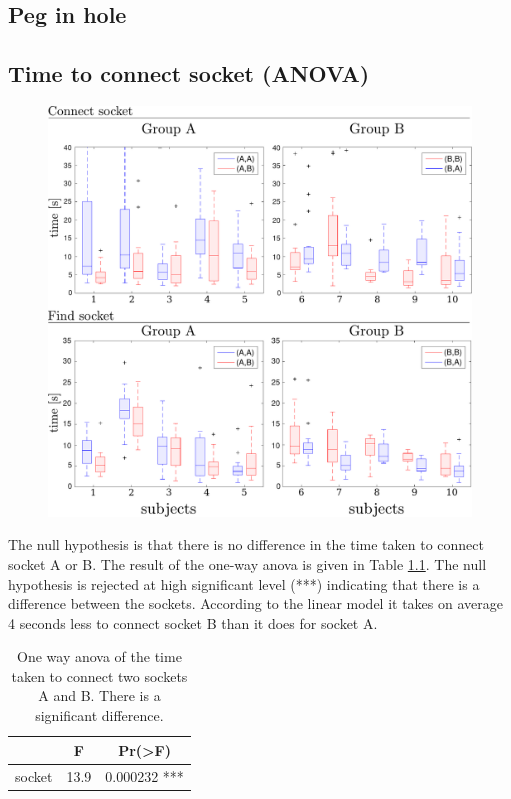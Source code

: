 
\begin{appendices}

\chapter{Peg in hole}

\section{Time to connect socket (ANOVA)}
\label{app:anova_socket}


\begin{figure}
 \centering
 \includegraphics[width=\textwidth]{./ch4-PiH/Figures/time_taken_subgroup.pdf}
 \caption{}
\end{figure}

The null hypothesis is that there is no difference in the time taken to connect socket A or B. The result of the one-way anova
is given in Table \ref{tab:ch4:anova_socket}. The null hypothesis is rejected at high significant level (***) indicating that 
there is a difference between the sockets. According to the linear model it takes on average 4 seconds less to connect socket B 
than it does for socket A.
  
\begin{table}[h]
\centering
\begin{tabular}{lcc}
  \hline
          &   F    & Pr(>F)  	     \\ \hline
   socket & 13.9   &  0.000232 *** 
\end{tabular}
\caption{One way anova of the time taken to connect two sockets A and B. There is a significant difference.}
\label{tab:ch4:anova_socket}
\end{table}


\end{appendices}

